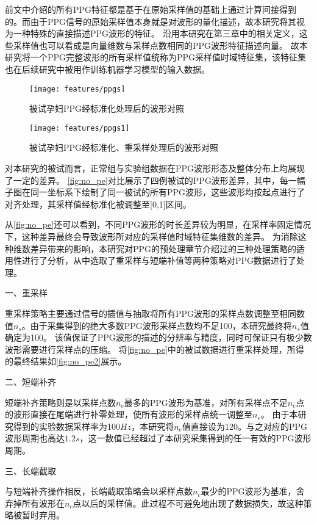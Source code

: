 前文中介绍的所有PPG特征都是基于在原始采样值的基础上通过计算间接得到的。而由于PPG信号的原始采样值本身就是对波形的量化描述，故本研究将其视为一种特殊的直接描述PPG波形的特征。
沿用本研究在第三章中的相关定义，这些采样值也可以看成是向量维数与采样点数相同的PPG波形特征描述向量。
故本研究将一个PPG完整波形的所有采样值统称为PPG采样值时域特征集，该特征集也在后续研究中被用作训练机器学习模型的输入数据。

\begin{figure}[htbp]
  \centering
  \texttt{[image: features/ppgs]}
  \caption{\label{fig:no_pe}被试孕妇PPG经标准化处理后的波形对照}
\end{figure}

\begin{figure}[htbp]
  \centering
  \texttt{[image: features/ppgs1]}
  \caption{\label{fig:no_pe2}被试孕妇PPG经标准化、重采样处理后的波形对照}
\end{figure}

对本研究的被试而言，正常组与实验组数据在PPG波形形态及整体分布上均展现了一定的差异。
\autoref{fig:no_pe}对比展示了四例被试的PPG波形差异，其中，每一幅子图在同一坐标系下绘制了同一被试的所有PPG波形，这些波形均按起点进行了对齐处理，其采样值经标准化被调整至[0,1]区间。

从\autoref{fig:no_pe}还可以看到，不同PPG波形的时长差异较为明显，在采样率固定情况下，这种差异最终会导致波形所对应的采样值时域特征集维数的差异。
为消除这种维数差异带来的影响，本研究对PPG的预处理章节介绍过的三种处理策略的适用性进行了分析，从中选取了重采样与短端补值等两种策略对PPG数据进行了处理。

一、重采样

重采样策略主要通过信号的插值与抽取将所有PPG波形的采样点数调整至相同数值$n_s$。由于采集得到的绝大多数PPG波形采样点数均不足100，本研究最终将$n_s$值确定为100。
该值保证了PPG波形的描述的分辨率与精度，同时可保证只有极少数波形需要进行采样点的压缩。
将\autoref{fig:no_pe}中的被试数据进行重采样处理，所得的最终结果如\autoref{fig:no_pe2}展示。

二、短端补齐

短端补齐策略则是以采样点数$n_e$最多的PPG波形为基准，对所有采样点不足$n_e$点的波形直接在尾端进行补零处理，使所有波形的采样点统一调整至$n_e$。
由于本研究得到的实验数据采样率为100$Hz$，本研究将$n_e$值直接设为120。与之对应的PPG波形周期也高达$1.2 s$，这一数值已经超过了本研究采集得到的任一有效的PPG波形周期。

三、长端截取

与短端补齐操作相反，长端截取策略会以采样点数$n_c$最少的PPG波形为基准，舍弃掉所有波形在$n_c$点以后的采样值。此过程不可避免地出现了数据损失，故这种策略被暂时弃用。


